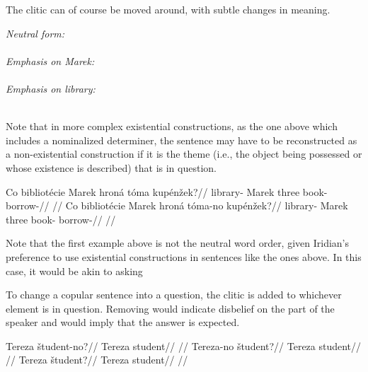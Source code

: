 The clitic  can of course be moved around, with subtle changes in meaning.

\pex
\a \emph{Neutral form:}\\
\\
\a \emph{Emphasis on \emph{Marek:}}\\
\\
\a \emph{Emphasis on \emph{library:}}\\
\\
\xe

Note that in more complex existential constructions, as the one above which includes a nominalized determiner, the sentence may have to be reconstructed as a non-existential construction if it is the theme (i.e., the object being possessed or whose existence is described) that is in question.

\pex
\a
\begingl
\gla Co bibliot\'ecie Marek hron\'a t\'oma kup\'en\v{z}ek?//
\glb {} library- Marek three book- borrow-//
\glft {}//
\endgl
\a
\begingl
\gla Co bibliot\'ecie Marek hron\'a t\'oma-no kup\'en\v{z}ek?//
\glb {} library- Marek three book- borrow-//
\glft {}//
\endgl
\xe

Note that the first example above is not the neutral word order, given Iridian's preference to use existential constructions in sentences like the ones above. In this case, it would be akin to asking 

To change a copular sentence into a question, the clitic  is added to whichever element is in question. Removing  would indicate disbelief on the part of the speaker and would imply that the answer  is expected.

\pex
\a
\begingl
\gla Tereza \v{s}tudent-no?//
\glb Tereza student//
\glft {}//
\endgl
\a
\begingl
\gla Tereza-no \v{s}tudent?//
\glb Tereza student//
\glft {}//
\endgl
\a
\begingl
\gla Tereza \v{s}tudent?//
\glb Tereza student//
\glft {}//
\endgl
\xe

